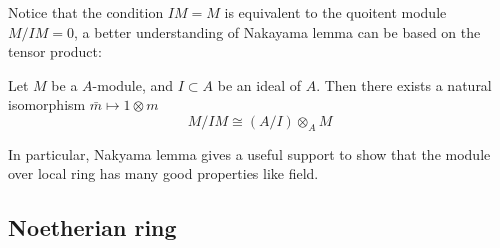\documentclass[12pt,a4paper]{article}
\begin{document}
Notice that the condition \(IM = M\) is equivalent to the quoitent module \(M/IM = 0\), a better understanding of Nakayama lemma can be based on the tensor product:
\begin{lemma}
    Let \(M\) be a \(A\)-module, and \(I \subset A\) be an ideal of \(A\). Then there exists a natural isomorphism \(\bar{m} \mapsto 1 \otimes m\)
    \[M/IM \cong (A/I) \otimes_A M\]
\end{lemma}

In particular, Nakyama lemma gives a useful support to show that the module over local ring has many good properties like field.



\subsection{Noetherian ring}
\end{document}
